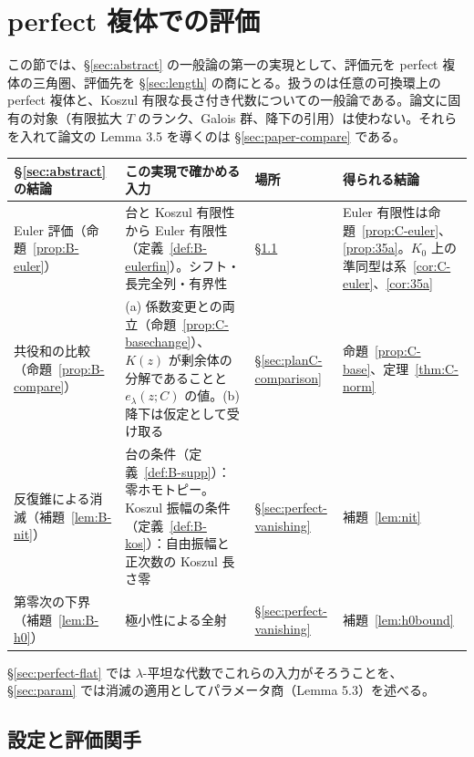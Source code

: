 \documentclass[11pt,a4paper]{ltjsarticle}
\numberwithin{equation}{section}
\theoremstyle{plain}
\theoremstyle{definition}
\theoremstyle{definition}
\begin{document}
\section{perfect 複体での評価}\label{sec:perfect}\label{sec:check-perfect}

この節では、§\ref{sec:abstract} の一般論の第一の実現として、評価元を perfect 複体の三角圏、評価先を §\ref{sec:length} の商にとる。扱うのは任意の可換環上の perfect 複体と、Koszul 有限な長さ付き代数についての一般論である。論文に固有の対象（有限拡大 $T$ のランク、Galois 群、降下の引用）は使わない。それらを入れて論文の Lemma 3.5 を導くのは §\ref{sec:paper-compare} である。
\begin{center}
\small
\begin{tabularx}{\textwidth}{>{\raggedright}p{3.0cm}>{\raggedright}X>{\raggedright}p{1.6cm}>{\raggedright\arraybackslash}p{3.0cm}}
\toprule
§\ref{sec:abstract} の結論 & この実現で確かめる入力 & 場所 & 得られる結論 \\
\midrule
Euler 評価（命題~\ref{prop:B-euler}） & 台と Koszul 有限性から Euler 有限性（定義~\ref{def:B-eulerfin}）。シフト・長完全列・有界性 & §\ref{sec:perfect-eval} & Euler 有限性は命題~\ref{prop:C-euler}、\ref{prop:35a}。$K_0$ 上の準同型は系~\ref{cor:C-euler}、\ref{cor:35a} \\
共役和の比較（命題~\ref{prop:B-compare}） & (a) 係数変更との両立（命題~\ref{prop:C-basechange}）、$K(z)$ が剰余体の分解であることと $e_\lambda(z;C)$ の値。(b) 降下は仮定として受け取る & §\ref{sec:planC-comparison} & 命題~\ref{prop:C-base}、定理~\ref{thm:C-norm} \\
反復錐による消滅（補題~\ref{lem:B-nit}） & 台の条件（定義~\ref{def:B-supp}）：零ホモトピー。Koszul 振幅の条件（定義~\ref{def:B-kos}）：自由振幅と正次数の Koszul 長さ零 & §\ref{sec:perfect-vanishing} & 補題~\ref{lem:nit} \\
第零次の下界（補題~\ref{lem:B-h0}） & 極小性による全射 & §\ref{sec:perfect-vanishing} & 補題~\ref{lem:h0bound} \\
\bottomrule
\end{tabularx}
\end{center}
§\ref{sec:perfect-flat} では $\lambda$-平坦な代数でこれらの入力がそろうことを、§\ref{sec:param} では消滅の適用としてパラメータ商（Lemma 5.3）を述べる。

\subsection{設定と評価関手}\label{sec:perfect-eval}
\end{document}
